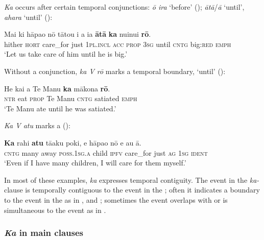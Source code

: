 \textit{Ka} occurs after certain temporal conjunctions: \textit{{\ꞌ}ō ira} ‘before’ (); \textit{{\ꞌ}ātā}/\textit{{\ꞌ}ā} ‘until’, \textit{{\ꞌ}ahara} ‘until’ (): 

\ea\label{ex:7.46}
\gll Mai ki hāpa{\ꞌ}o nō tātou i a ia \textbf{{\ꞌ}ātā} \textbf{ka} nuinui \textbf{rō}. \\
hither \textsc{hort} care\_for just \textsc{1pl.incl} \textsc{acc} \textsc{prop} \textsc{3sg} until \textsc{cntg} big:\textsc{red} \textsc{emph} \\

\glt
‘Let us take care of him until he is big.’ \textstyleExampleref{[R211.063]} 
\z

Without a conjunction, \textit{ka V rō} marks a temporal boundary, ‘until’ ():

\ea\label{ex:7.47}
\gll He kai a Te Manu \textbf{ka} mākona \textbf{rō}. \\
\textsc{ntr} eat \textsc{prop} Te Manu \textsc{cntg} satiated \textsc{emph} \\

\glt
‘Te Manu ate until he was satiated.’ \textstyleExampleref{[R245.067]} 
\z

\textit{Ka V atu} marks a  ():

\ea\label{ex:7.48}
\gll \textbf{Ka} rahi \textbf{atu} tā{\ꞌ}aku poki, e hāpa{\ꞌ}o nō e au {\ꞌ}ā. \\
\textsc{cntg} many away \textsc{poss.1sg.a} child \textsc{ipfv} care\_for just \textsc{ag} \textsc{1sg} \textsc{ident} \\

\glt
‘Even if I have many children, I will care for them myself.’ \textstyleExampleref{[R229.023]} 
\z

In most of these examples, \textit{ka} expresses temporal contiguity. The event in the \textit{ka-}clause is temporally contiguous to the event in the ; often it indicates a boundary to the event in the  as in ,  and ; sometimes the event overlaps with or is simultaneous to the  event as in . 

\subsubsection{\textit{Ka} in main clauses}\label{sec:7.2.6.3}

